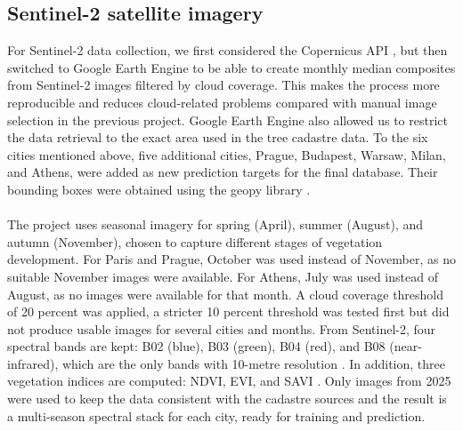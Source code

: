 \subsection{Sentinel-2 satellite imagery}

For Sentinel-2 data collection, we first considered the Copernicus API \cite{copernicus2025}, but then switched to Google Earth Engine \cite{earthenginecodeeditor} to be able to create monthly median composites from Sentinel-2 images filtered by cloud coverage. This makes the process more reproducible and reduces cloud-related problems compared with manual image selection in the previous project. Google Earth Engine also allowed us to restrict the data retrieval to the exact area used in the tree cadastre data. To the six cities mentioned above, five additional cities, Prague, Budapest, Warsaw, Milan, and Athens, were added as new prediction targets for the final database. Their bounding boxes were obtained using the geopy library \cite{geopy}.\\
\\
The project uses seasonal imagery for spring (April), summer (August), and autumn (November), chosen to capture different stages of vegetation development. For Paris and Prague, October was used instead of November, as no suitable November images were available. For Athens, July was used instead of August, as no images were available for that month. A cloud coverage threshold of 20 percent was applied, a stricter 10 percent threshold was tested first but did not produce usable images for several cities and months. From Sentinel-2, four spectral bands are kept: B02 (blue), B03 (green), B04 (red), and B08 (near-infrared), which are the only bands with 10-metre resolution \cite{sentinel2harmonized}. In addition, three vegetation indices are computed: NDVI, EVI, and SAVI \cite{ndvitutorial}. Only  images from 2025 were used to keep the data consistent with the cadastre sources and the result is a multi-season spectral stack for each city, ready for training and prediction.

